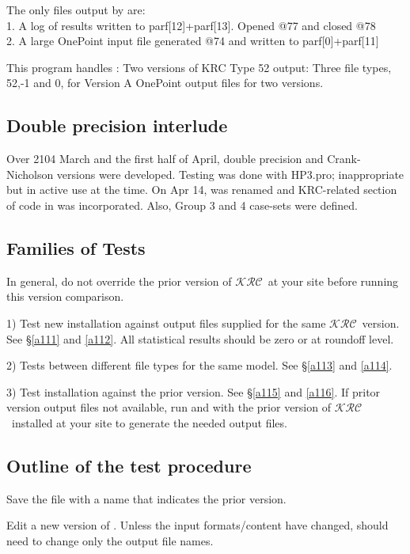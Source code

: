 \documentclass{article}  %
\newcommand{\krc}{$\mathcal{KRC}$~}    %
\begin{document}
The only files output by  are:
\\ 1. A log of results written to parf[12]+parf[13]. Opened @77 and closed @78
\\ 2. A large OnePoint input file generated @74 and written to parf[0]+parf[11]

This program handles :
\qi Two versions of KRC Type 52 output: 
\qi Three file types, 52,-1 and 0, for Version A
\qi OnePoint output files for two versions.

\subsection{Double precision interlude}
Over 2104 March and the first half of April, double precision and Crank-Nicholson versions were developed. Testing was done with HP3.pro; inappropriate but in active use at the time. On Apr 14,    was renamed   and  KRC-related section of code in was incorporated. Also, Group 3 and 4 case-sets were defined.

\subsection{Families of Tests}

\Large
In general, do not override the prior version of \krc at your site before running this version comparison.
\normalsize

1) Test new installation against output files supplied for the same \krc version. See \S \ref{a111} and  \ref{a112}.
\qi All statistical results should be zero or at roundoff level.

2) Tests between different file types for the same model. See \S \ref{a113} and  \ref{a114}.

3) Test installation against the prior version. See \S \ref{a115} and  \ref{a116}.
\qi If pritor version output files not available, run  and  with the prior version of \krc installed at your site to generate the needed output files.

\subsection{Outline of the test procedure}

Save the   file with a name that indicates the prior version.

Edit a new version of .  Unless the input formats/content have changed, should need to change only the output file names.
\end{document}
